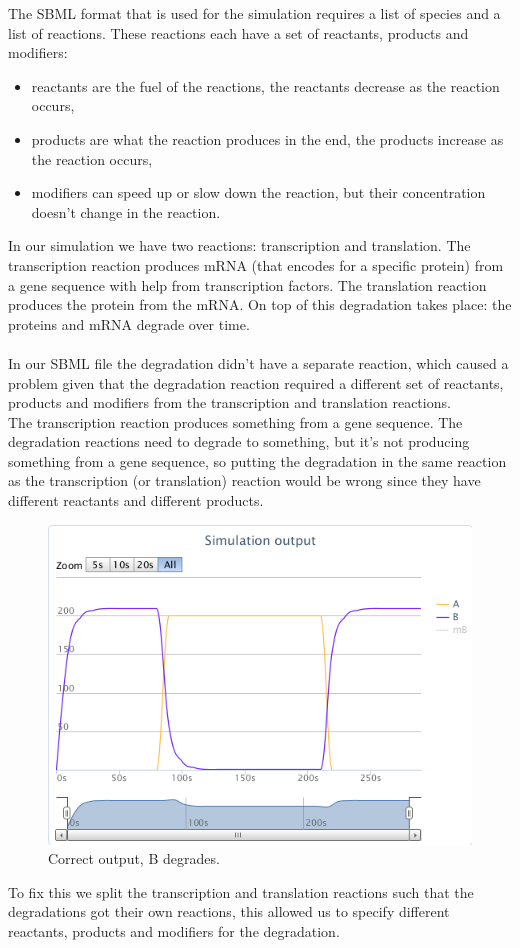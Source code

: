 \documentclass[a4paper]{article}
\begin{document}
\noindent The SBML format that is used for the simulation requires a list of species and a list of reactions. These reactions each have a set of reactants, products and modifiers:
\begin{itemize}
	\item reactants are the fuel of the reactions, the reactants decrease as the reaction occurs,
	\item products are what the reaction produces in the end, the products increase as the reaction occurs,
	\item modifiers can speed up or slow down the reaction, but their concentration doesn't change in the reaction.
\end{itemize}
In our simulation we have two reactions: transcription and translation. The transcription reaction produces mRNA (that encodes for a specific protein) from a gene sequence with help from transcription factors. The translation reaction produces the protein from the mRNA. On top of this degradation takes place: the proteins and mRNA degrade over time.\\
\\
In our SBML file the degradation didn't have a separate reaction, which caused a problem given that the degradation reaction required a different set of reactants, products and modifiers from the transcription and translation reactions.\\
The transcription reaction produces something from a gene sequence. The degradation reactions need to degrade to something, but it's not producing something from a gene sequence, so putting the degradation in the same reaction as the transcription (or translation) reaction would be wrong since they have different reactants and different products.\\

\begin{figure}
	\centering\includegraphics[scale=0.5]{../../screenshots/2012-06-14-not-output.png}
	\caption{Correct output, B degrades.}
\end{figure}

\noindent To fix this we split the transcription and translation reactions such that the degradations got their own reactions, this allowed us to specify different reactants, products and modifiers for the degradation.
\end{document}
